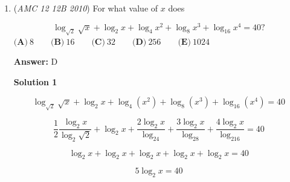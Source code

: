 \begin{enumerate}
 \textbf{Addendum (Alternate)} $7\mid 1001a^3+110b^2$ and $1001 \equiv 0 \pmod 7$. Knowing that $a$ does not factor (pun intended) into the problem, note 110's prime factorization and $7\mid b$. There are only 10 possible digits for $b$, 0 through 9, but $7\mid b$ only holds if $b=0, 7$. This is 2 of the 10 digits, so $\frac{2}{10}=\boxed{\textbf{(E) }\frac{1}{5}}$




\textbf{Solution 4}

The palindrome is in the form of $\overline{abba}$. There are $9$ possible values of $a$ and 10 possible values for $b$. Thus, there are $90$ four-digit palindromes. The smallest palindrome is $1001$, which is a multiple of $7$. Note how each palindrome with the same thousands and ones digit increase by $110$ (i.e., $1111-1001=110$, $1221-1111=110$, etc). $110 \equiv 5$ (mod $7$). Since $5$ and $7$ is coprime, to get another palindrome that is a multiple of $7$, we need to increase by $770$. $1001+770=1771$. Next, when the thousands place is $2$, we start with $2002$, which is a multiple of $1001$, so $2002 \equiv 0$ (mod $7$). Therefore, $2772$ is also a satisfactory palindrome. Similarly, for every thousands place, there are $2$ satisfactory palindromes, which means there are a total of $2 \cdot 9 = 18$ satisfactory palindromes. Thus, the answer is $\frac{18}{90} = \frac{1}{5}$ or $\boxed{\text{(E)}\ \frac{1}{5}}$.

 


	\item (\textit{AMC 12 12B 2010}) For what value of $x$ does


 
 \[\log_{\sqrt{2}}\sqrt{x}+\log_{2}{x}+\log_{4}{x^2}+\log_{8}{x^3}+\log_{16}{x^4}=40?\]
$\textbf{(A)}\ 8 \qquad \textbf{(B)}\ 16 \qquad \textbf{(C)}\ 32 \qquad \textbf{(D)}\ 256 \qquad \textbf{(E)}\ 1024$

 \textbf{Answer: }D



\textbf{Solution 1}


 \[\log_{\sqrt{2}}\sqrt{x} + \log_2x + \log_4(x^2) + \log_8(x^3) + \log_{16}(x^4)  = 40\]

 \[\frac{1}{2} \frac{\log_2x}{\log_2\sqrt{2}} + \log_2x + \frac{2\log_2x}{\log_24} + \frac{3\log_2x}{\log_28} + \frac{4\log_2x}{\log_216}  = 40\]

 \[\log_2x + \log_2x + \log_2x + \log_2x + \log_2x = 40\]

 \[5\log_2x = 40\]


\end{enumerate}
